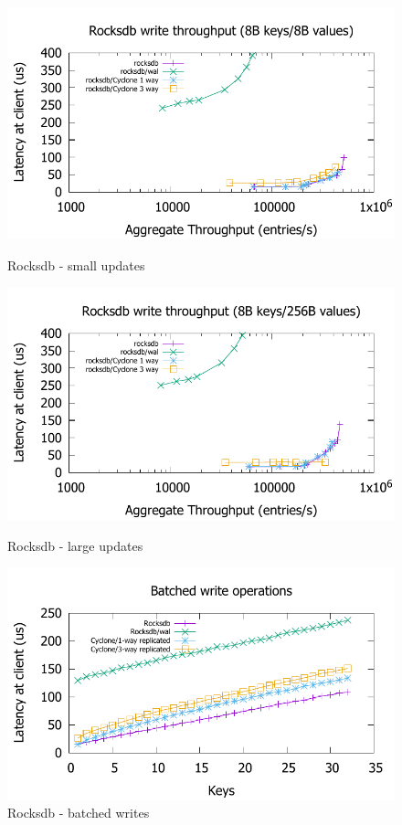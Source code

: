 \documentclass[letterpaper,twocolumn,10pt]{article}
\begin{document}
\begin{figure}
\begin{minipage}{.33\textwidth}
    \centering
    \includegraphics[scale=0.45]{results2/rocksdb.pdf}
    \caption{Rocksdb - small updates}
    \label{fig:rocksdb}
  \end{minipage}
  \begin{minipage}{.33\textwidth}
    \includegraphics[scale=0.45]{results2/rocksdb_256.pdf}
    \caption{Rocksdb - large updates}
    \label{fig:rocksdb_256}
  \end{minipage}
  \begin{minipage}{.33\textwidth}
    \includegraphics[scale=0.45]{results2/rocksdb_multi.pdf}
    \caption{Rocksdb - batched writes}
    \label{fig:rocksdb_multi}
\end{minipage}
\end{figure}
\end{document}
